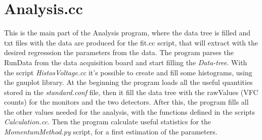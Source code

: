 \documentclass[10pt,a4paper]{article}
\begin{document}
\section{Analysis.cc}

This is the main part of the Analysis program, where the data tree is filled and txt files with the data are produced for the fit.cc script, that will extract with the desired regresssion the parameters from the data. The program parses the RunData from the data acquisition board and start filling the \textit{Data-tree}. With the script \textit{HistosVoltage.cc} it's possible to create and fill some histograms, using the gnuplot library. At the beginning the program loads all the useful quantities stored in the \textit{standard.conf} file, then it fill the data tree with the rawValues (VFC counts) for the monitors and the two detectors. After this, the program fills all the other values needed for the analysis, with the functions defined in the scripts \textit{Calculation.cc}. Then the program calculate useful statistics for the \textit{MomentumMethod.py} script, for a first estimation of the parameters.
\end{document}

